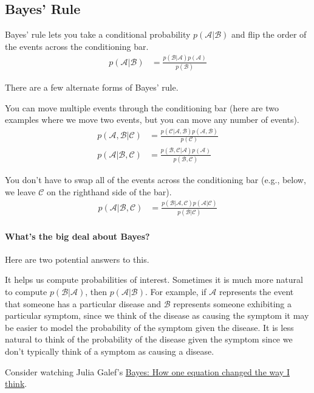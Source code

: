 \documentclass{tufte-handout}
\begin{document}
\subsection{Bayes' Rule}

Bayes' rule lets you take a conditional probability $p(\mathcal{A}|\mathcal{B})$ and flip the order of the events across the conditioning bar.
\begin{align}
p(\mathcal{A}|\mathcal{B}) &= \frac{p(\mathcal{B}|\mathcal{A}) p(\mathcal{A})}{p(\mathcal{B})}
\end{align}

There are a few alternate forms of Bayes' rule.
\bi
\item You can move multiple events through the conditioning bar (here are two examples where we move two events, but you can move any number of events).
\begin{align}
p(\mathcal{A}, \mathcal{B} | \mathcal{C}) &= \frac{p(\mathcal{C}|\mathcal{A}, \mathcal{B}) p(\mathcal{A}, \mathcal{B})}{p(\mathcal{C})} \\
p(\mathcal{A} |  \mathcal{B}, \mathcal{C}) &= \frac{p(\mathcal{B}, \mathcal{C}|\mathcal{A}) p(\mathcal{A})}{p(\mathcal{B}, \mathcal{C})}
\end{align}
\item You don't have to swap all of the events across the conditioning bar (e.g., below, we leave $\mathcal{C}$ on the righthand side of the bar).
\begin{align}
p(\mathcal{A}|\mathcal{B},\mathcal{C}) &= \frac{p(\mathcal{B} | \mathcal{A}, \mathcal{C}) p(\mathcal{A}|\mathcal{C})}{p(\mathcal{B}|\mathcal{C})}
\end{align}
\ei


\paragraph{What's the big deal about Bayes?}
Here are two potential answers to this.
\bi
\item It helps us compute probabilities of interest.  Sometimes it is much more natural to compute $p(\mathcal{B} | \mathcal{A})$, then $p(\mathcal{A} | \mathcal{B})$.  For example, if $\mathcal{A}$ represents the event that someone has a particular disease and $\mathcal{B}$ represents someone exhibiting a particular symptom, since we think of the disease as causing the symptom it may be easier to model the probability of the symptom given the disease.  It is less natural to think of the probability of the disease given the symptom since we don't typically think of a symptom as causing a disease.
\item Consider watching Julia Galef's \href{https://www.youtube.com/watch?v=za7RqnT7CM0}{Bayes: How one equation changed the way I think}.
\ei
\end{document}
